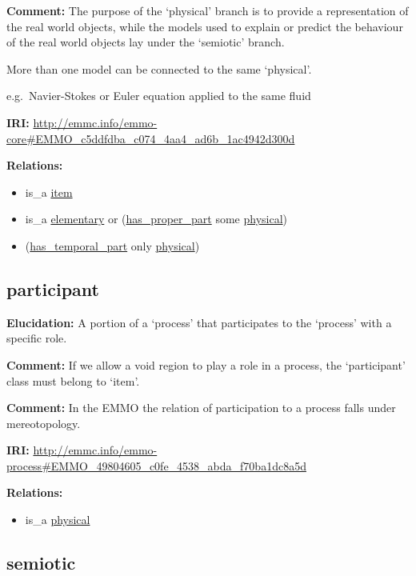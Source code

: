 \documentclass[a4paper,]{report}
\providecommand{\tightlist}{%
  \setlength{\itemsep}{0pt}\setlength{\parskip}{0pt}}
\begin{document}
\textbf{Comment:} The purpose of the `physical' branch is to provide a
representation of the real world objects, while the models used to
explain or predict the behaviour of the real world objects lay under the
`semiotic' branch.

More than one model can be connected to the same `physical'.

e.g.~Navier-Stokes or Euler equation applied to the same fluid

\textbf{IRI:}
\url{http://emmc.info/emmo-core\#EMMO_c5ddfdba_c074_4aa4_ad6b_1ac4942d300d}

\textbf{Relations:}

\begin{itemize}
\tightlist
\item
  is\_a \protect\hyperlink{item}{item}
\item
  is\_a \protect\hyperlink{elementary}{elementary} or
  (\protect\hyperlink{has_proper_part}{has\_proper\_part} some
  \protect\hyperlink{physical}{physical})
\item
  (\protect\hyperlink{has_temporal_part}{has\_temporal\_part} only
  \protect\hyperlink{physical}{physical})
\end{itemize}

\hypertarget{participant}{%
\subsection{participant}\label{participant}}

\textbf{Elucidation:} A portion of a `process' that participates to the
`process' with a specific role.

\textbf{Comment:} If we allow a void region to play a role in a process,
the `participant' class must belong to `item'.

\textbf{Comment:} In the EMMO the relation of participation to a process
falls under mereotopology.

\textbf{IRI:}
\url{http://emmc.info/emmo-process\#EMMO_49804605_c0fe_4538_abda_f70ba1dc8a5d}

\textbf{Relations:}

\begin{itemize}
\tightlist
\item
  is\_a \protect\hyperlink{physical}{physical}
\end{itemize}

\hypertarget{semiotic-1}{%
\subsection{semiotic}\label{semiotic-1}}
\end{document}
